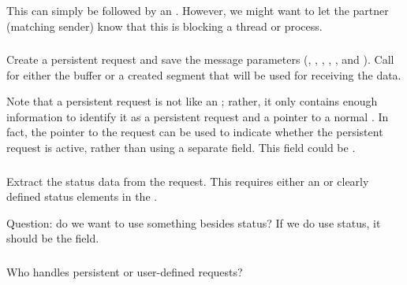 \documentclass{article}
\begin{document}
\subsubsection{}
This can simply be  followed by an .  However,
we might want to let the partner (matching sender) know that this is blocking
a thread or process.  

\subsubsection{}
\begin{adi3}
Create a persistent request and save the message
parameters (, 
, , 
,
, and
). 
Call  for either the buffer or a created segment
that will be used for receiving the data.  

Note that a persistent request is not like an
; rather, it only contains enough information
to identify it as a persistent request and a pointer to a normal
.  In fact, the pointer to the request can be
used to indicate whether the persistent request is active, rather than
using a separate field.  This field could be
.
\end{adi3}

\subsubsection{}
Extract the status data from the request.
This requires either an  or clearly defined
status elements in the .

Question: do we want to use something besides status?  If we do use
status, it should be the  field.

\subsubsection{}
\begin{adi3}
\end{adi3}
Who handles persistent or user-defined requests?
\end{document}
